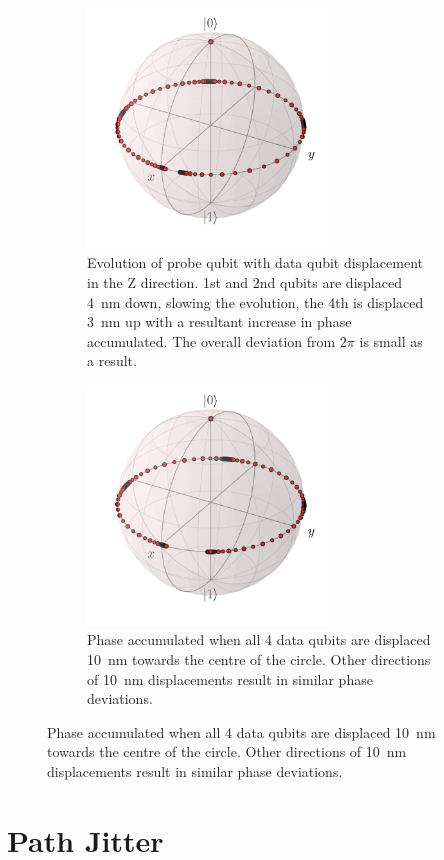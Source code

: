 \begin{figure}
	\centering
	\caption{Phase errors as a result of misplaced data qubits.}
	\begin{subfigure}[t]{\textwidth}
		\centering
		\includegraphics[width=0.7\textwidth]{figures/z_offset.pdf}
		\caption{Evolution of probe qubit with data qubit displacement in the Z direction. 1st and 2nd qubits are displaced \SI{4}{\nano\metre} down, slowing the evolution, the 4th is displaced \SI{3}{\nano\metre} up with a resultant increase in phase accumulated. The overall deviation from $2\pi$ is small as a result.}
		\label{fig:zoffset}
	\end{subfigure}
	\begin{subfigure}[t]{\textwidth}
		\centering
		\includegraphics[width=0.7\textwidth]{figures/10nm_displacement_inward.pdf}
		\caption{Phase accumulated when all 4 data qubits are displaced \SI{10}{\nano\metre} towards the centre of the circle. Other directions of \SI{10}{\nano\metre} displacements result in similar phase deviations.}
		\label{fig:inwarddisplacement}
	\end{subfigure}
	\label{fig:overall_displacement}
\end{figure}



\section{Path Jitter}

